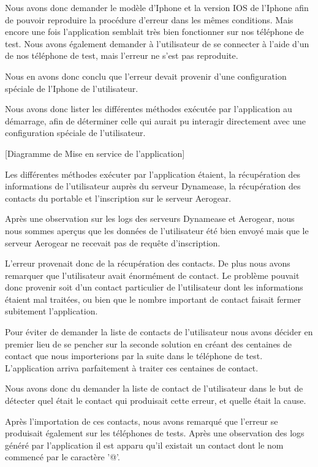 Nous avons donc demander le modèle d'Iphone et la version IOS de l'Iphone afin de pouvoir reproduire la procédure d'erreur dans les mêmes conditions. Mais encore une fois l'application semblait très bien fonctionner sur nos téléphone de test. Nous avons également demander à l'utilisateur de se connecter à l'aide d'un de nos téléphone de test, mais l'erreur ne s'est pas reproduite.

Nous en avons donc conclu que l'erreur devait provenir d'une configuration spéciale de l'Iphone de l'utilisateur.

Nous avons donc lister les différentes méthodes exécutée par l'application au démarrage, afin de déterminer celle qui aurait pu interagir directement avec une configuration spéciale de l'utilisateur.

[Diagramme de Mise en service de l'application]

Les différentes méthodes exécuter par l'application étaient, la récupération des informations de l'utilisateur auprès du serveur Dynamease, la récupération des contacts du portable et l'inscription sur le serveur Aerogear.

Après une observation sur les logs des serveurs Dynamease et Aerogear, nous nous sommes aperçus que les données de l'utilisateur été bien envoyé mais que le serveur Aerogear ne recevait pas de requête d'inscription.

L'erreur provenait donc de la récupération des contacts. De plus nous avons remarquer que l'utilisateur avait énormément de contact. Le problème pouvait donc provenir soit d'un contact particulier de l'utilisateur dont les informations étaient mal traitées, ou bien que le nombre important de contact faisait fermer subitement l'application.

Pour éviter de demander la liste de contacts de l'utilisateur nous avons décider en premier lieu de se pencher sur la seconde solution en créant des centaines de contact que nous importerions par la suite dans le téléphone de test. L'application arriva parfaitement à traiter ces centaines de contact.

Nous avons donc du demander la liste de contact de l'utilisateur dans le but de détecter quel était le contact qui produisait cette erreur, et quelle était la cause.

Après l'importation de ces contacts, nous avons remarqué que l'erreur se produisait également  sur les téléphones de tests. Après une observation des logs généré par l'application il est apparu qu'il existait un contact dont le nom commencé par le caractère '@'.

